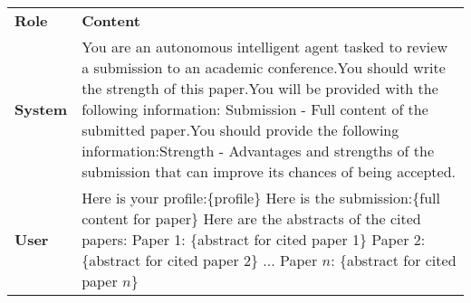 \begin{table*}[htbp]
\centering
\footnotesize
\renewcommand{\arraystretch}{1.3}
\begin{tabular}{p{1cm}p{11.5cm}}
\toprule[1.5pt]
\textbf{Role} & \textbf{Content} \\ 
\cmidrule[0.5pt](lr){1-2}
\textbf{System} & You are an autonomous intelligent agent tasked to review a submission to an academic conference.\newline You should write the strength of this paper.\newline You will be provided with the following information: \newline Submission - Full content of the submitted paper.\newline You should provide the following information:\newline Strength - Advantages and strengths of the submission that can improve its chances of being accepted. \\ \midrule
\textbf{User} & Here is your profile:\newline \{profile\} \newline Here is the submission:\newline \{full content for paper\} \newline Here are the abstracts of the cited papers:\newline
Paper 1: \{abstract for cited paper 1\}\newline
Paper 2: \{abstract for cited paper 2\}\newline
...\newline
Paper $n$: \{abstract for cited paper $n$\}\newline

\end{tabular}
\end{table*}
